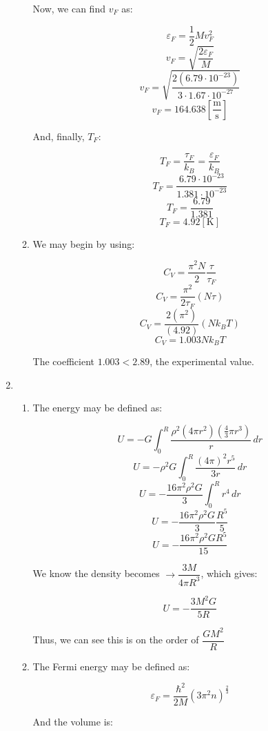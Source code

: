 \begin{enumerate}
\begin{enumerate}
        Now, we can find $v_F$ as:

        $$\varepsilon_F=\frac{1}{2}Mv_F^2$$
        $$v_F=\sqrt{\frac{2\varepsilon_F}{M}}$$
        $$v_F=\sqrt{\frac{2(6.79\cdot10^{-23})}{3\cdot1.67\cdot10^{-27}}}$$
        $$\boxed{v_F=164.638\left[ \frac{\si{\meter}}{\si{\second}} \right]}$$

        And, finally, $T_F$:

        $$T_F=\frac{\tau_F}{k_B}=\frac{\varepsilon_F}{k_B}$$
        $$T_F=\frac{6.79\cdot10^{-23}}{1.381\cdot10^{-23}}$$
        $$T_F=\frac{6.79}{1.381}$$
        $$\boxed{T_F=4.92[\si{\kelvin}]}$$

      \item 

        We may begin by using:

        $$C_V=\frac{\pi^2N}{2}\frac{\tau}{\tau_F}$$
        $$C_V=\frac{\pi^2}{2\tau_F}(N\tau)$$
        $$C_V=\frac{2(\pi^2)}{(4.92)}(Nk_BT)$$
        $$\boxed{C_V=1.003Nk_BT}$$

        The coefficient $1.003<2.89$, the experimental value.

    \end{enumerate}

  \item

    \begin{enumerate}

      \item 

        The energy may be defined as:

        $$U=-G\int_0^R\frac{\rho^2(4\pi r^2)\left( \frac{4}{3}\pi r^3 \right)}{r}\,dr$$
        $$U=-\rho^2G\int_0^R\frac{(4\pi)^2r^5}{3r}\,dr$$
        $$U=-\frac{16\pi^2\rho^2G}{3}\int_0^R r^4\,dr$$
        $$U=-\frac{16\pi^2\rho^2G}{3}\frac{R^5}{5}$$
        $$U=-\frac{16\pi^2\rho^2GR^5}{15}$$

        We know the density becomes $\rightarrow\dfrac{3M}{4\pi R^3}$, which gives:

        $$\boxed{U=-\frac{3M^2G}{5R}}$$

        Thus, we can see this is on the order of $\dfrac{GM^2}{R}$

      \item 

        The Fermi energy may be defined as:

        $$\varepsilon_F=\frac{\hbar^2}{2M}(3\pi^2n)^{\frac{2}{3}}$$

        And the volume is:


\end{enumerate}
\end{enumerate}

